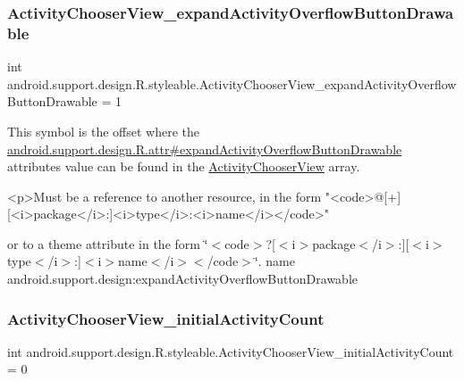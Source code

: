 \subsubsection{\texorpdfstring{Activity\+Chooser\+View\+\_\+expand\+Activity\+Overflow\+Button\+Drawable}{ActivityChooserView\_expandActivityOverflowButtonDrawable}}
{\footnotesize\ttfamily int android.\+support.\+design.\+R.\+styleable.\+Activity\+Chooser\+View\+\_\+expand\+Activity\+Overflow\+Button\+Drawable = 1\hspace{0.3cm}{\ttfamily [static]}}

This symbol is the offset where the \hyperlink{classandroid_1_1support_1_1design_1_1R_1_1attr_a61a0824e68ce23d2cb1bea33aeaf44f7}{android.\+support.\+design.\+R.\+attr\#expand\+Activity\+Overflow\+Button\+Drawable} attribute\textquotesingle{}s value can be found in the \hyperlink{classandroid_1_1support_1_1design_1_1R_1_1styleable_a793c8e02386efdda6b3cf815e635b3fe}{Activity\+Chooser\+View} array.

\begin{DoxyVerb}      <p>Must be a reference to another resource, in the form "<code>@[+][<i>package</i>:]<i>type</i>:<i>name</i></code>"
\end{DoxyVerb}
 or to a theme attribute in the form \char`\"{}$<$code$>$?\mbox{[}$<$i$>$package$<$/i$>$\+:\mbox{]}\mbox{[}$<$i$>$type$<$/i$>$\+:\mbox{]}$<$i$>$name$<$/i$>$$<$/code$>$\char`\"{}.  name android.\+support.\+design\+:expand\+Activity\+Overflow\+Button\+Drawable \mbox{\label{classandroid_1_1support_1_1design_1_1R_1_1styleable_a588768b369a43efd493bc2a06b766e2a}} 
\subsubsection{\texorpdfstring{Activity\+Chooser\+View\+\_\+initial\+Activity\+Count}{ActivityChooserView\_initialActivityCount}}
{\footnotesize\ttfamily int android.\+support.\+design.\+R.\+styleable.\+Activity\+Chooser\+View\+\_\+initial\+Activity\+Count = 0\hspace{0.3cm}{\ttfamily [static]}}

